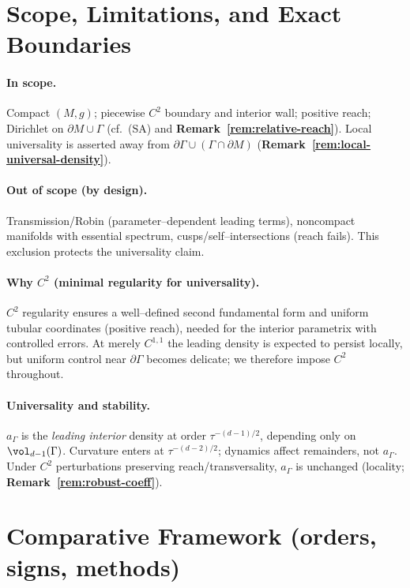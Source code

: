 \medskip

\section{Scope, Limitations, and Exact Boundaries}\label{sec:scope}

\paragraph{In scope.}
Compact $(M,g)$; piecewise $C^2$ boundary and interior wall; positive reach; Dirichlet on $\partial M\cup\Gamma$ (cf.\ (SA) and \textbf{Remark~\ref{rem:relative-reach}}).
Local universality is asserted away from $\partial\Gamma\cup(\Gamma\cap\partial M)$ (\textbf{Remark~\ref{rem:local-universal-density}}).

\paragraph{Out of scope (by design).}
Transmission/Robin (parameter–dependent leading terms), noncompact manifolds with essential spectrum, cusps/self–intersections (reach fails).
This exclusion protects the universality claim.

\paragraph{Why \texorpdfstring{$C^2$}{C2} (minimal regularity for universality).}
$C^2$ regularity ensures a well–defined second fundamental form and uniform tubular coordinates (positive reach), needed for the interior parametrix with controlled errors. At merely $C^{1,1}$ the leading density is expected to persist locally, but uniform control near $\partial\Gamma$ becomes delicate; we therefore impose $C^2$ throughout.

\paragraph{Universality and stability.}
$a_\Gamma$ is the \emph{leading interior} density at order $\tau^{-(d-1)/2}$, depending only on $\vol_{d-1}(\Gamma)$.
Curvature enters at $\tau^{-(d-2)/2}$; dynamics affect remainders, not $a_\Gamma$.
Under $C^2$ perturbations preserving reach/transversality, $a_\Gamma$ is unchanged (locality; \textbf{Remark~\ref{rem:robust-coeff}}).

\medskip

\section{Comparative Framework (orders, signs, methods)}\label{sec:comparative}

